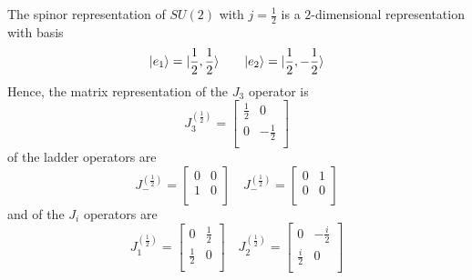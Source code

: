     The spinor representation of $SU(2)$ with $j=\frac{1}{2}$ is a $2$-dimensional representation with basis
    \begin{equation*}
        \vert e_1\rangle = \vert\frac{1}{2}, \frac{1}{2}\rangle \qquad \vert e_2\rangle = \vert\frac{1}{2}, - \frac{1}{2}\rangle
    \end{equation*}
    Hence, the matrix representation of the $J_3$ operator is
    \begin{equation*}
        J_3^{(\frac{1}{2})} = \begin{bmatrix}
            \frac{1}{2} & 0 \\ 0 & - \frac{1}{2} \\
        \end{bmatrix}
    \end{equation*}
    of the ladder operators are 
    \begin{equation*}
        J_-^{(\frac{1}{2})} = \begin{bmatrix}
            0 & 0 \\ 1 & 0 \\
        \end{bmatrix} \quad J_-^{(\frac{1}{2})} = \begin{bmatrix}
            0 & 1 \\ 0 & 0 \\
        \end{bmatrix}
    \end{equation*}
    and of the $J_i$ operators are
    \begin{equation*}
        J_1^{(\frac{1}{2})} = \begin{bmatrix}
            0 & \frac{1}{2} \\ \frac{1}{2} & 0 \\
        \end{bmatrix} \quad J_2^{(\frac{1}{2})} = \begin{bmatrix}
            0 & - \frac{i}{2} \\ \frac{i}{2} & 0 \\
        \end{bmatrix}
    \end{equation*}

